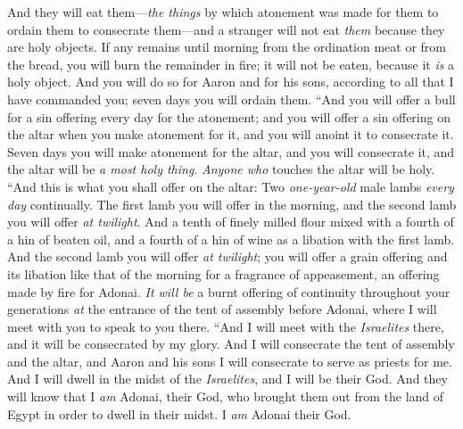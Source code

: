 \begin{biblechapter}
\verse And they will eat them—\textit{the things} by which atonement was made for them to ordain them to consecrate them—and a stranger will not eat \textit{them} because they are holy objects.
\verse If any remains until morning from the ordination meat or from the bread, you will burn the remainder in fire; it will not be eaten, because it \textit{is} a holy object.
\verse And you will do so for Aaron and for his sons, according to all that I have commanded you; seven days you will ordain them.
 “And you will offer a bull for a sin offering every day for the atonement; and you will offer a sin offering on the altar when you make atonement for it, and you will anoint it to consecrate it.
\verse Seven days you will make atonement for the altar, and you will consecrate it, and the altar will be \textit{a most holy thing}. \textit{Anyone who} touches the altar will be holy.
\verse “And this is what you shall offer on the altar: Two \textit{one-year-old} male lambs \textit{every day} continually.
\verse The first lamb you will offer in the morning, and the second lamb you will offer \textit{at twilight}.
\verse And a tenth of finely milled flour mixed with a fourth of a hin of beaten oil, and a fourth of a hin of wine as a libation with the first lamb.
\verse And the second lamb you will offer \textit{at twilight}; you will offer a grain offering and its libation like that of the morning for a fragrance of appeasement, an offering made by fire for Adonai.
\verse \textit{It will be} a burnt offering of continuity throughout your generations \textit{at} the entrance of the tent of assembly before Adonai, where I will meet with you to speak to you there.
\verse “And I will meet with the \textit{Israelites} there, and it will be consecrated by my glory.
\verse And I will consecrate the tent of assembly and the altar, and Aaron and his sons I will consecrate to serve as priests for me.
\verse And I will dwell in the midst of the \textit{Israelites}, and I will be their God.
\verse And they will know that I \textit{am} Adonai, their God, who brought them out from the land of Egypt in order to dwell in their midst. I \textit{am} Adonai their God.
\end{biblechapter}

